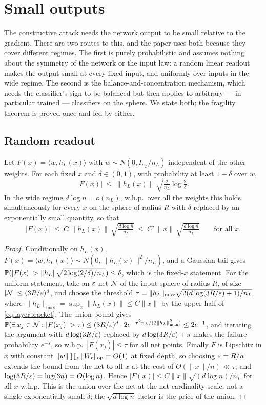 \section{Small outputs}\label{sec:small}

The constructive attack needs the network output to be small relative to the gradient. There are two
routes to this, and the paper uses both because they cover different regimes. The first is purely
probabilistic and assumes nothing about the symmetry of the network or the input law: a random linear
readout makes the output small at every fixed input, and uniformly over inputs in the wide regime.
The second is the balance-and-concentration mechanism, which needs the classifier's sign to be
balanced but then applies to arbitrary --- in particular trained --- classifiers on the sphere. We
state both; the fragility theorem is proved once and fed by either.

\subsection{Random readout}
\begin{proposition}\label{prop:readout}
Let $F(x)=\langle w,h_L(x)\rangle$ with $w\sim N(0,I_{n_L}/n_L)$ independent of the other weights. For
each fixed $x$ and $\delta\in(0,1)$, with probability at least $1-\delta$ over $w$,
\[
  |F(x)|\ \le\ \|h_L(x)\|\,\sqrt{\tfrac{2}{n_L}\log\tfrac2\delta}.
\]
In the wide regime $d\log\bar n=o(n_L)$, w.h.p.\ over all the weights this holds simultaneously for
every $x$ on the sphere of radius $R$ with $\delta$ replaced by an exponentially small quantity, so
that
\[
  |F(x)|\ \le\ C\,\|h_L(x)\|\,\sqrt{\tfrac{d\log \bar n}{n_L}}\ \le\ C'\,\|x\|\,\sqrt{\tfrac{d\log\bar n}{n_L}}
  \qquad\text{for all }x .
\]
\end{proposition}

\begin{proof}
Conditionally on $h_L(x)$, $F(x)=\langle w,h_L(x)\rangle\sim N(0,\|h_L(x)\|^2/n_L)$, and a Gaussian tail
gives $\PP(|F(x)|>\|h_L\|\sqrt{2\log(2/\delta)/n_L})\le\delta$, which is the fixed-$x$ statement. For the
uniform statement, take an $\varepsilon$-net $\mathcal N$ of the input sphere of radius $R$, of size
$|\mathcal N|\le(3R/\varepsilon)^d$, and choose the threshold $\tau=\|h_L\|_{\max}\sqrt{2(d\log(3R/\varepsilon)+1)/n_L}$
where $\|h_L\|_{\max}=\sup_x\|h_L(x)\|\le C\|x\|$ by the upper half of \eqref{eq:layerbracket}. The union
bound gives $\PP(\exists\,x_j\in\mathcal N:|F(x_j)|>\tau)\le(3R/\eps)^d\cdot2e^{-\tau^2n_L/(2\|h_L\|_{\max}^2)}\le2e^{-1}$,
and iterating the argument with $d\log(3R/\varepsilon)$ replaced by $d\log(3R/\varepsilon)+s$ makes the failure
probability $e^{-s}$, so w.h.p.\ $|F(x_j)|\le\tau$ for all net points. Finally $F$ is Lipschitz in $x$
with constant $\|w\|\prod_\ell\|W_\ell\|_{\mathrm{op}}=O(1)$ at fixed depth, so choosing $\varepsilon=R/n$ extends the
bound from the net to all $x$ at the cost of $O(\|x\|/n)\ll\tau$, and $\log(3R/\varepsilon)=\log(3n)=O(\log n)$.
Hence $|F(x)|\le C\|x\|\sqrt{(d\log n)/n_L}$ for all $x$ w.h.p. This is the union over the net at the
net-cardinality scale, not a single exponentially small $\delta$; the $\sqrt{d\log n}$ factor is the
price of the union.
\end{proof}

